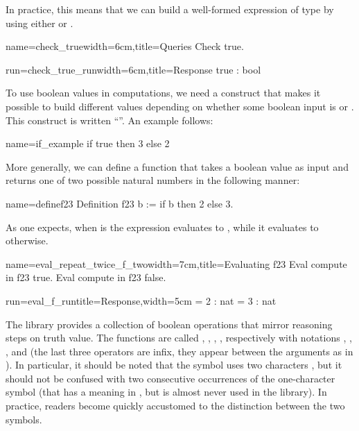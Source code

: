 In practice, this means that we can build a well-formed expression of
type  by using either  or . 

\begin{coq}{name=check_true}{width=6cm,title=Queries}
Check true.
\end{coq}
\begin{coqout}{run=check_true_run}{width=6cm,title=Response}
true : bool
\end{coqout}

To use boolean values in computations, we need a construct that makes
it possible to build different values depending on whether some
boolean input is  or .  This construct is written
``''.  An example follows:

\begin{coq}{name=if_example}{}
if true then 3 else 2
\end{coq}
More generally, we can define a function that takes a boolean value as
input and returns one of two possible natural numbers in the following
manner:

\begin{coq}{name=definef23}{}
Definition f23 b := if b then 2 else 3.
\end{coq}

As one expects, when  is  the expression
 evaluates to , while it evaluates to  otherwise.

\begin{coq}{name=eval_repeat_twice_f_two}{width=7cm,title=Evaluating f23}
Eval compute in f23 true.
Eval compute in f23 false.
\end{coq}
\begin{coqout}{run=eval_f_run}{title=Response,width=5cm}
  = 2 : nat
  = 3 : nat
\end{coqout}

The \mcbMC{} library provides a collection of boolean operations that
mirror reasoning steps on truth value.  The functions are called
, ,  , , respectively with notations
\C{\~\~},  \C{||}, \C{&&}, and \C{==>} (the last three operators are
infix, they appear between the arguments as in ).
  In
particular, it should be
noted that the symbol \C{\~\~} uses two characters \C{\~}, but it should
not be confused with two consecutive occurrences of the one-character symbol
\C{\~} (that has a meaning in \Coq{}, but is almost never used
in the \mcbMC{} library).  In practice, readers become quickly accustomed to the
distinction between the two symbols.

